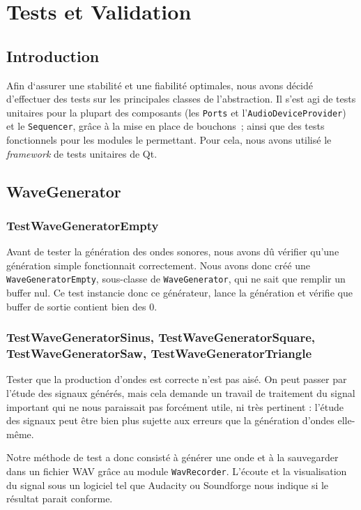 \section{Tests et Validation}

\subsection{Introduction}

Afin
d`assurer une stabilité et une fiabilité optimales, nous avons décidé d'effectuer des tests sur les principales classes de l'abstraction. Il s'est agi de tests unitaires pour la plupart des composants (les \verb!Ports! et l'\verb!AudioDeviceProvider!)
et le \verb!Sequencer!, grâce à la mise en place de bouchons~;
ainsi que des tests fonctionnels pour les modules le permettant.
Pour cela, nous avons utilisé le \emph{framework} de tests
unitaires de Qt.

\subsection{WaveGenerator}

\subsubsection{TestWaveGeneratorEmpty}

Avant de tester la génération des ondes sonores, nous avons dû
vérifier qu'une génération simple fonctionnait correctement. Nous
avons donc créé une \verb!WaveGeneratorEmpty!, sous-classe de
\verb!WaveGenerator!, qui ne sait que remplir un buffer nul. Ce
test instancie donc ce générateur, lance la génération et vérifie
que buffer de sortie contient bien des 0.

\subsubsection{TestWaveGeneratorSinus, TestWaveGeneratorSquare, TestWaveGeneratorSaw, TestWaveGeneratorTriangle}

Tester que la production d'ondes est correcte n'est pas aisé. On
peut passer par l'étude des signaux générés, mais cela demande un
travail de traitement du signal important qui ne nous paraissait
pas forcément utile, ni très pertinent : l'étude des signaux peut
être bien plus sujette aux erreurs que la génération d'ondes
elle-même.

Notre méthode de test a donc consisté à générer une onde et à la
sauvegarder dans un fichier WAV grâce au module \verb!WavRecorder!.
L'écoute et la visualisation du signal sous un logiciel tel que
Audacity ou Soundforge nous indique si le résultat parait
conforme.

